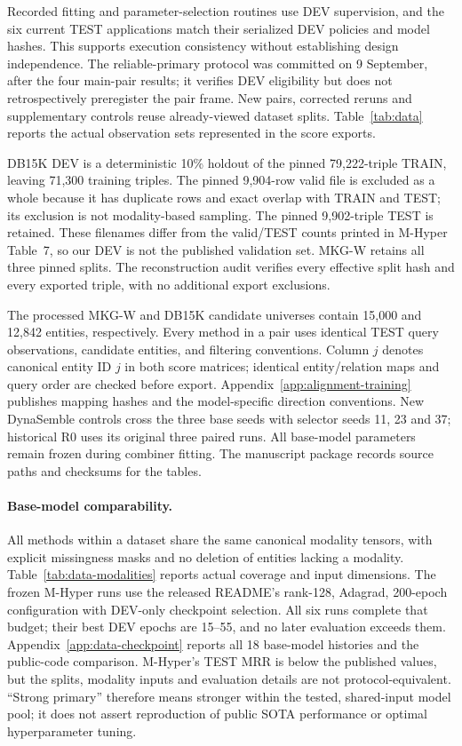\documentclass[11pt,a4paper]{article}
\begin{document}
Recorded fitting and parameter-selection routines use DEV supervision, and the six current TEST applications match their serialized DEV policies and model hashes. This supports execution consistency without establishing design independence. The reliable-primary protocol was committed on 9 September, after the four main-pair results; it verifies DEV eligibility but does not retrospectively preregister the pair frame. New pairs, corrected reruns and supplementary controls reuse already-viewed dataset splits. Table~\ref{tab:data} reports the actual observation sets represented in the score exports.



DB15K DEV is a deterministic 10\% holdout of the pinned 79,222-triple TRAIN, leaving 71,300 training triples. The pinned 9,904-row valid file is excluded as a whole because it has duplicate rows and exact overlap with TRAIN and TEST; its exclusion is not modality-based sampling. The pinned 9,902-triple TEST is retained. These filenames differ from the valid/TEST counts printed in M-Hyper Table~7, so our DEV is not the published validation set. MKG-W retains all three pinned splits. The reconstruction audit verifies every effective split hash and every exported triple, with no additional export exclusions.

The processed MKG-W and DB15K candidate universes contain 15,000 and 12,842 entities, respectively. Every method in a pair uses identical TEST query observations, candidate entities, and filtering conventions. Column $j$ denotes canonical entity ID $j$ in both score matrices; identical entity/relation maps and query order are checked before export. Appendix~\ref{app:alignment-training} publishes mapping hashes and the model-specific direction conventions. New DynaSemble controls cross the three base seeds with selector seeds 11, 23 and 37; historical R0 uses its original three paired runs. All base-model parameters remain frozen during combiner fitting. The manuscript package records source paths and checksums for the tables.

\paragraph{Base-model comparability.}
All methods within a dataset share the same canonical modality tensors, with explicit missingness masks and no deletion of entities lacking a modality. Table~\ref{tab:data-modalities} reports actual coverage and input dimensions. The frozen M-Hyper runs use the released README's rank-128, Adagrad, 200-epoch configuration with DEV-only checkpoint selection. All six runs complete that budget; their best DEV epochs are 15--55, and no later evaluation exceeds them. Appendix~\ref{app:data-checkpoint} reports all 18 base-model histories and the public-code comparison. M-Hyper's TEST MRR is below the published values, but the splits, modality inputs and evaluation details are not protocol-equivalent. ``Strong primary'' therefore means stronger within the tested, shared-input model pool; it does not assert reproduction of public SOTA performance or optimal hyperparameter tuning.
\end{document}
